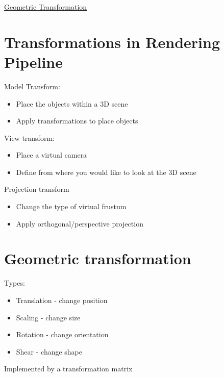 \documentclass{article}[18pt]
\begin{document}
\begin{center}
\underline{\huge Geometric Transformation}
\end{center}
\section{Transformations in Rendering Pipeline}
Model Transform:
\begin{itemize}
	\item Place the objects within a 3D scene
	\item Apply transformations to place objects
\end{itemize}
View transform:
\begin{itemize}
	\item Place a virtual camera
	\item Define from where you would like to look at the 3D scene
\end{itemize}
Projection transform
\begin{itemize}
	\item Change the type of virtual frustum
	\item Apply orthogonal/perspective projection
\end{itemize}
\section{Geometric transformation}
Types:
\begin{itemize}
	\item Translation - change position
	\item Scaling - change size
	\item Rotation - change orientation
	\item Shear - change shape
\end{itemize}
Implemented by a transformation matrix
\end{document}
